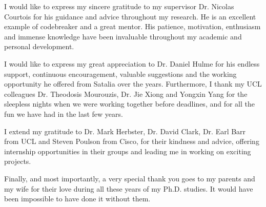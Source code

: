 \begin{acknowledgements}
I would like to express my sincere gratitude to my supervisor Dr. Nicolas Courtois for his guidance and advice throughout my research. He is an excellent example of codebreaker and a great mentor.  His patience, motivation, enthusiasm and immense knowledge have been invaluable throughout my academic and personal development.

I would like to express my great appreciation to Dr. Daniel Hulme for his endless support, continuous encouragement, valuable suggestions and the working opportunity he offered from Satalia over the years. Furthermore, I thank my UCL colleagues Dr. Theodosis Mourouzis, Dr. Jie Xiong and Yongxin Yang for the sleepless nights when we were working together before deadlines, and for all the fun we have had in the last few years.

I extend my gratitude to Dr. Mark Herbster, Dr. David Clark, Dr. Earl Barr from UCL and Steven Poulson from Cisco, for their kindness and advice, offering internship opportunities in their groups and leading me in working on exciting projects. 

Finally, and most importantly, a very special thank you goes to my parents and my wife for their love during all these years of my Ph.D. studies. It would have been impossible to have done it without them.

\end{acknowledgements}

\setcounter{tocdepth}{2} 

\tableofcontents
\listoffigures
\listoftables

